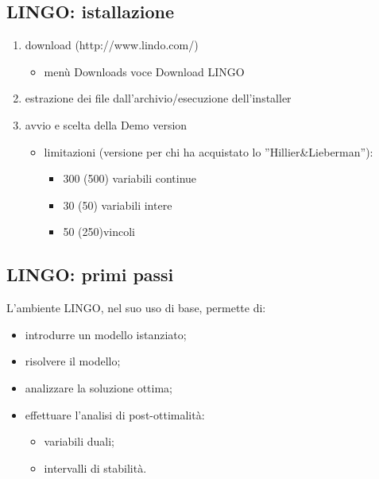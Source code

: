 \documentclass{beamer}
\def\lyxframeend{} %
\begin{document}
\lyxframeend{}\subsection{LINGO: istallazione}


\lyxframeend{}
\begin{enumerate}
\item download (http://www.lindo.com/)

\begin{itemize}
\item men\`u Downloads voce Download LINGO
\end{itemize}
\item estrazione dei file dall'archivio/esecuzione dell'installer
\item avvio e scelta della \textquotedbl{}Demo version\textquotedbl{}

\begin{itemize}
\item limitazioni (versione per chi ha acquistato lo ''Hillier\&Lieberman''):

\begin{itemize}
\item 300 (500) variabili continue
\item 30 (50) variabili intere 
\item 50 (250)vincoli 
\end{itemize}
\end{itemize}
\end{enumerate}

\lyxframeend{}\subsection{LINGO: primi passi}


\lyxframeend{}
L'ambiente LINGO, nel suo uso di base, permette di:

\begin{itemize}
\item introdurre un modello istanziato;
\item risolvere il modello;
\item analizzare la soluzione ottima;
\item effettuare l'analisi di post-ottimalit\`a:

\begin{itemize}
\item variabili duali;
\item intervalli di stabilit\`a.
\end{itemize}
\end{itemize}
\end{document}
